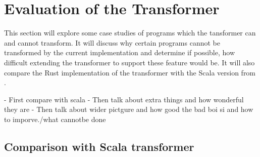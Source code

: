 \documentclass[ oneside,%
                    author={James Elgar},
                    degree={MEng},
                     title={Bidirectional transformer between functional and \\ object-oriented programming in Rust},
                  subtitle={}]{dissertation}
\begin{document}

% 


\chapter{Evaluation of the Transformer}
\label{chap:evaluation}

This section will explore some case studies of programs which the tansformer can and cannot transform. It will discuss why certain programs cannot be transformed by the current implementation and determine if possible, how difficult extending the transformer to support these feature would be. It will also compare the Rust implementation of the transformer with the Scala version from \cite{food}.

- First compare with scala
- Then talk about extra things and how wonderful they are
- Then talk about wider pictgure and how good the bad boi si and how to imporve./what cannotbe done  



\section{Comparison with Scala transformer} 
\end{document}
